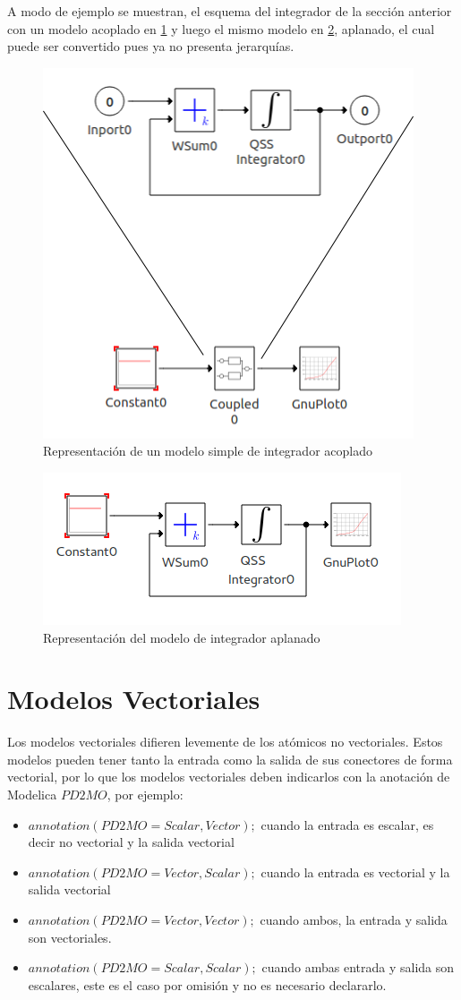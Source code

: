 A modo de ejemplo se muestran, el esquema del integrador de la sección anterior con un modelo acoplado en \ref{fig:acomplado} y luego el mismo modelo en \ref{fig:aplanado}, aplanado, el cual puede ser convertido pues ya no presenta jerarquías.

\begin{figure}[H]
\centering
 \includegraphics[width=0.5\linewidth]{integrator-sample}
 \caption{Representación de un modelo simple de integrador acoplado}
 \label{fig:acomplado}
\end{figure}


\begin{figure}[H]
\centering
 \includegraphics[width=0.5\linewidth]{integrator-expanded}
 \caption{Representación del modelo de integrador aplanado }
 \label{fig:aplanado}
\end{figure}



\section{Modelos Vectoriales}
Los modelos vectoriales difieren levemente de los atómicos no vectoriales. Estos modelos pueden tener tanto la entrada como la salida de sus conectores de forma vectorial, por lo que los modelos vectoriales deben indicarlos con la anotación de Modelica $PD2MO$, por ejemplo:
\begin{itemize}
\item $annotation(PD2MO = {Scalar, Vector});$ cuando la entrada es escalar, es decir no vectorial y la salida vectorial
\item $annotation(PD2MO = {Vector, Scalar});$ cuando la entrada es vectorial y la salida vectorial
\item $annotation(PD2MO = {Vector, Vector});$ cuando ambos, la entrada y salida son vectoriales.
\item $annotation(PD2MO = {Scalar, Scalar});$ cuando ambas entrada y salida son escalares, este es el caso por omisión y no es necesario declararlo.
\end{itemize}

